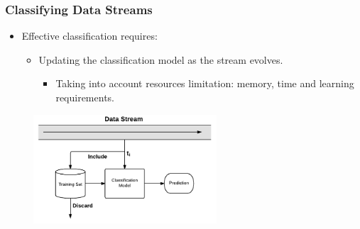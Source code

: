 \documentclass[14pt]{beamer}
\begin{document}







\begin{frame}\frametitle{Classifying Data Streams}

\begin{itemize}
\item Effective classification requires:
\begin{itemize}
\item Updating the classification model as the stream evolves.
\begin{itemize}
\item Taking into account resources limitation: memory, time and learning requirements.
\end{itemize}
\end{itemize}
\end{itemize}

\vspace{-0.2in}
\begin{figure}
\centering
\includegraphics[height=1.60in]{Stream2}
\end{figure}
\end{frame}
\end{document}
